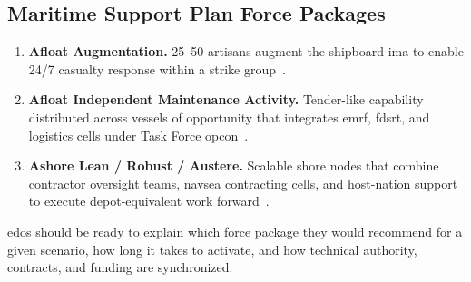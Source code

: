 \documentclass[../main.tex]{subfiles}
\begin{document}
\subsection{Maritime Support Plan Force Packages}
\begin{enumerate}
  \item \textbf{Afloat Augmentation.} 25--50 artisans augment the shipboard \ac{ima} to enable 24/7 casualty response within a strike group~\autocite{CPF-MSP-PLANORD-2023}.
  \item \textbf{Afloat Independent Maintenance Activity.} Tender-like capability distributed across vessels of opportunity that integrates \ac{emrf}, \ac{fdsrt}, and logistics cells under Task Force \ac{opcon}~\autocite{CPF-MSP-PLANORD-2023}.
  \item \textbf{Ashore Lean / Robust / Austere.} Scalable shore nodes that combine contractor oversight teams, \ac{navsea} contracting cells, and host-nation support to execute depot-equivalent work forward~\autocite{CPF-MSP-PLANORD-2023}.
\end{enumerate}
\acp{edo} should be ready to explain which force package they would recommend for a given scenario, how long it takes to activate, and how technical authority, contracts, and funding are synchronized.

\end{document}
